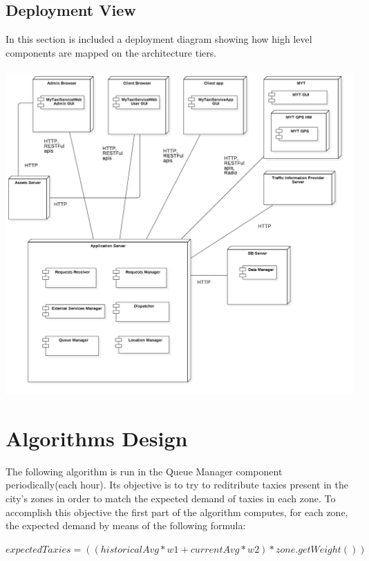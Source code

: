 \documentclass[11pt,titlepage]{article} %
\begin{document}
\newpage

\subsection{Deployment View}
In this section is included a deployment diagram showing how high level components are mapped on the architecture tiers.\newline
\hfill \\
\hfill \\
\includegraphics[scale=0.4]{deployment.png}

\newpage

\section{Algorithms Design}
The following algorithm is run in the Queue Manager component periodically(each hour).
  Its objective is to try to reditribute taxies present in the city's zones in order
  to match the expected demand of taxies in each zone.
  To accomplish this objective the first part of the algorithm computes, for each zone,
  the expected demand by means of the following formula:\newline

    $ expectedTaxies = ((historicalAvg*w1+currentAvg*w2)*zone.getWeight()) $\newline
\end{document}
